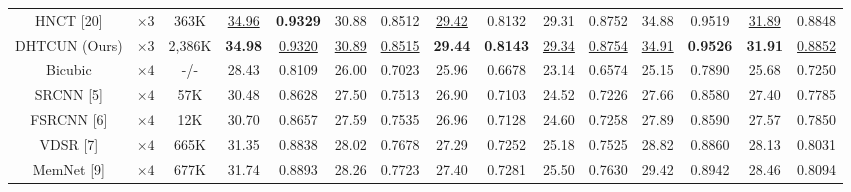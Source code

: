 \documentclass{ieeeaccess}
\begin{document}
\begin{table}
\begin{tabular}{|c|c|c|cc|cc|cc|cc|cc|cc|}
HNCT [20] & $\times 3$ &363K& \multicolumn{1}{c|}{\color{blue}\underline{34.96}} & {\color{red}\textbf{0.9329}} & \multicolumn{1}{c|}{30.88} & 0.8512 & \multicolumn{1}{c|}{\color{blue}\underline{29.42}} & 0.8132 & \multicolumn{1}{c|}{29.31} &0.8752 & \multicolumn{1}{c|}{34.88} & 0.9519
&\multicolumn{1}{c|}{\color{blue}\underline{31.89}} & 0.8848\\

DHTCUN (Ours) & $\times3$ &2,386K& \multicolumn{1}{c|}{\color{red}\textbf{34.98}} &{\color{blue}\underline{0.9320}}& \multicolumn{1}{c|}{\color{blue}\underline{30.89}} & {\color{blue}\underline{0.8515}}& \multicolumn{1}{c|}{\color{red}\textbf{29.44}} &{\color{red}\textbf{0.8143}}& \multicolumn{1}{c|}{\color{blue}\underline{29.34}} &{\color{blue}\underline{0.8754}}& \multicolumn{1}{c|}{\color{blue}\underline{34.91}} &{\color{red}\textbf{0.9526}} &\multicolumn{1}{c|}{\color{red}\textbf{31.91}} &{\color{blue}\underline{0.8852}}\\

\hline

Bicubic&$\times4$ &-/-& \multicolumn{1}{c|}{28.43 } &0.8109 & \multicolumn{1}{c|}{26.00  } &0.7023& \multicolumn{1}{c|}{25.96 } & 0.6678  & \multicolumn{1}{c|}{23.14 } & 0.6574  & \multicolumn{1}{c|}{25.15} &0.7890

&\multicolumn{1}{c|}{25.68} &0.7250\\


SRCNN [5] & $\times4$  &57K& \multicolumn{1}{c|}{30.48 } &0.8628   & \multicolumn{1}{c|}{27.50 } &0.7513  &\multicolumn{1}{c|}{ 26.90 } & 0.7103 & \multicolumn{1}{c|}{24.52 } &0.7226 & \multicolumn{1}{c|}{27.66 } &0.8580
&\multicolumn{1}{c|}{ 27.40} &0.7785 \\

FSRCNN [6]& $\times4$ &12K& \multicolumn{1}{c|}{30.70} & 0.8657& \multicolumn{1}{c|}{27.59} &0.7535  &\multicolumn{1}{c|}{26.96} &0.7128 & \multicolumn{1}{c|}{24.60} &0.7258 & \multicolumn{1}{c|}{27.89 } &0.8590
&\multicolumn{1}{c|}{27.57} &0.7850 \\

VDSR [7]& $\times4$ &665K & \multicolumn{1}{c|}{31.35} &0.8838 & \multicolumn{1}{c|}{28.02} & 0.7678&\multicolumn{1}{c|}{27.29} &0.7252 & \multicolumn{1}{c|}{25.18} &0.7525 & \multicolumn{1}{c|}{28.82 } & 0.8860
&\multicolumn{1}{c|}{28.13} &0.8031 \\

MemNet [9] & $\times4$ &677K& \multicolumn{1}{c|}{31.74} &0.8893& \multicolumn{1}{c|}{28.26} &0.7723 &\multicolumn{1}{c|}{27.40} &0.7281& \multicolumn{1}{c|}{25.50} &0.7630& \multicolumn{1}{c|}{29.42} & 0.8942
&\multicolumn{1}{c|}{28.46} &0.8094\\


\end{tabular}
\end{table}
\end{document}

